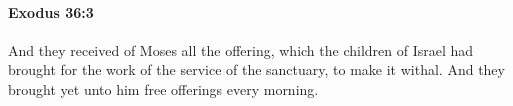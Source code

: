 
		\paragraph{Exodus 36:3} %
			\label{EXODUS-36-3}

			And they received of Moses all the offering, which the children of Israel had brought for the work of the service of the sanctuary, to make it withal. And they brought yet unto him free offerings every morning.


